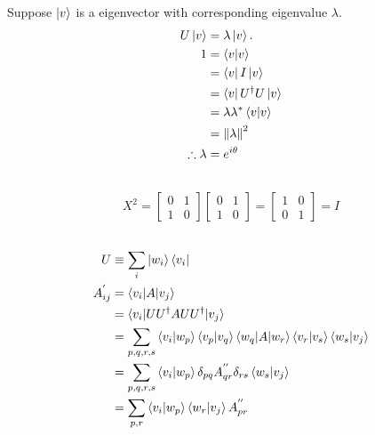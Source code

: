 \setcounter{subsection}{17}
\subsection{}
Suppose $\ket{v}$ is a eigenvector with corresponding eigenvalue $\lambda$.
\begin{align}
	U \ket{v} &= \lambda \ket{v}.\\
	1 &= \braket{v | v}\\
	&= \bra{v} I \ket{v}\\
	&= \bra{v} U^\dagger U \ket{v}\\
	&= \lambda \lambda^* \braket{v | v}\\
	&= \left\lVert\lambda\right\rVert^2\\
	\therefore \lambda &= e^{i \theta}
\end{align}




\subsection{}
\begin{align}
	X^2 = \begin{bmatrix}
		0 & 1 \\ 
		1 & 0
	\end{bmatrix} 
	\begin{bmatrix}
		0 & 1 \\ 
		1 & 0
	\end{bmatrix}
	= \begin{bmatrix}
		1 & 0 \\ 
		0 & 1
	\end{bmatrix} = I
\end{align}



\subsection{}
\begin{align}
	U &\equiv \sum_i \ket{w_i}\bra{v_i}\\
	A_{ij}^{'} &= \braket{v_i | A | v_j}\\
	&= \braket{v_i | UU^\dagger A UU^\dagger | v_j}\\
	&= \sum_{p,q,r,s} \braket{v_i | w_p} \braket{v_p | v_q} \braket{w_q | A | w_r} \braket{v_r | v_s} \braket{w_s | v_j}\\
	&= \sum_{p,q,r,s} \braket{v_i | w_p} \delta_{pq} A_{qr}^{''} \delta_{rs}  \braket{w_s | v_j}\\
	&= \sum_{p,r}  \braket{v_i | w_p}  \braket{w_r | v_j} A_{pr}^{''}
\end{align}


\setcounter{subsection}{25}
\subsection{}






